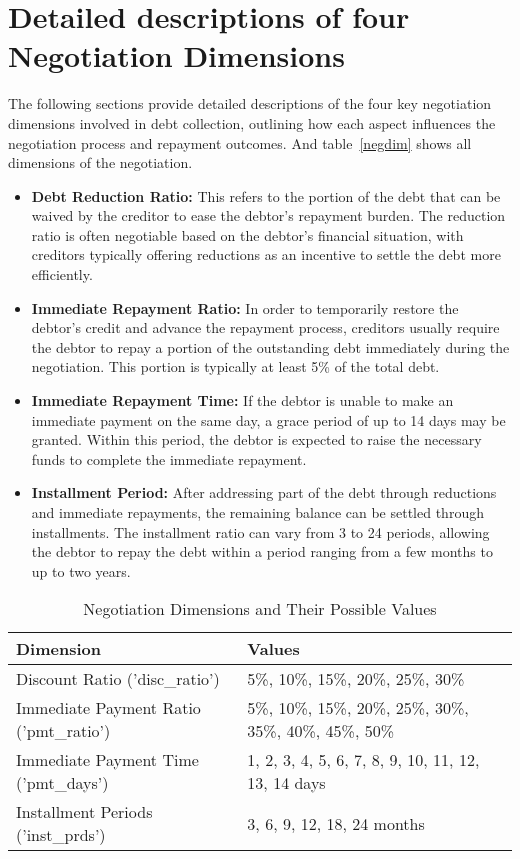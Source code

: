 \section{Detailed descriptions of four Negotiation Dimensions}\label{sec:dim}

The following sections provide detailed descriptions of the four key negotiation dimensions involved in debt collection, outlining how each aspect influences the negotiation process and repayment outcomes. And table~\ref{negdim} shows all dimensions of the negotiation.

\begin{itemize}[leftmargin=15px]
    \item \textbf{Debt Reduction Ratio:} This refers to the portion of the debt that can be waived by the creditor to ease the debtor’s repayment burden. The reduction ratio is often negotiable based on the debtor’s financial situation, with creditors typically offering reductions as an incentive to settle the debt more efficiently.

    \item \textbf{Immediate Repayment Ratio:} In order to temporarily restore the debtor’s credit and advance the repayment process, creditors usually require the debtor to repay a portion of the outstanding debt immediately during the negotiation. This portion is typically at least 5\% of the total debt.

    \item \textbf{Immediate Repayment Time:} If the debtor is unable to make an immediate payment on the same day, a grace period of up to 14 days may be granted. Within this period, the debtor is expected to raise the necessary funds to complete the immediate repayment.

    \item \textbf{Installment Period:} After addressing part of the debt through reductions and immediate repayments, the remaining balance can be settled through installments. The installment ratio can vary from 3 to 24 periods, allowing the debtor to repay the debt within a period ranging from a few months to up to two years.
\end{itemize}

\begin{table*}[ht]
\centering
\caption{\label{negdim}Negotiation Dimensions and Their Possible Values}
\begin{tabular}{ll}
\toprule
\textbf{Dimension} & \textbf{Values} \\
\midrule
Discount Ratio ('disc\_ratio') & 5\%, 10\%, 15\%, 20\%, 25\%, 30\% \\
Immediate Payment Ratio ('pmt\_ratio') & 5\%, 10\%, 15\%, 20\%, 25\%, 30\%, 35\%, 40\%, 45\%, 50\% \\
Immediate Payment Time ('pmt\_days') & 1, 2, 3, 4, 5, 6, 7, 8, 9, 10, 11, 12, 13, 14 days \\
Installment Periods ('inst\_prds') & 3, 6, 9, 12, 18, 24 months \\
\bottomrule
\end{tabular}
\label{tab:negotiation_dimensions}
\end{table*}

